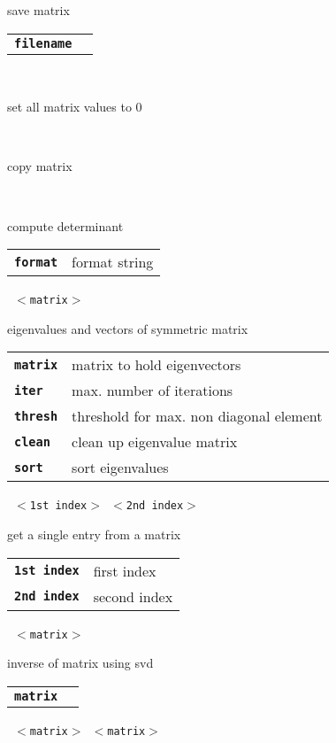 \begin{description}
\begin{description}
        save matrix

      \begin{tabular}{ll}
 \texttt{\textbf{filename}} &    \\
      \end{tabular}
       \texttt{} \

        set all matrix values to 0

       \texttt{} \

        copy matrix

       \texttt{ } \

        compute determinant

      \begin{tabular}{ll}
 \texttt{\textbf{format}} &  format string  \\
      \end{tabular}
       \texttt{ $<$matrix$>$    } \

        eigenvalues and vectors of symmetric matrix

      \begin{tabular}{ll}
 \texttt{\textbf{matrix}} &  matrix to hold eigenvectors \\
 \texttt{\textbf{iter}} &     max. number of iterations  \\
 \texttt{\textbf{thresh}} &   threshold for max. non diagonal element  \\
 \texttt{\textbf{clean}} &    clean up eigenvalue matrix  \\
 \texttt{\textbf{sort}} &     sort eigenvalues  \\
      \end{tabular}
       \texttt{ $<$1st index$>$ $<$2nd index$>$} \

        get a single entry from a matrix

      \begin{tabular}{ll}
 \texttt{\textbf{1st index}} &  first index  \\
 \texttt{\textbf{2nd index}} &  second index  \\
      \end{tabular}
       \texttt{ $<$matrix$>$} \

        inverse of matrix using svd

      \begin{tabular}{ll}
 \texttt{\textbf{matrix}} &  \\
      \end{tabular}
       \texttt{ $<$matrix$>$ $<$matrix$>$} \


\end{description}
\end{description}
